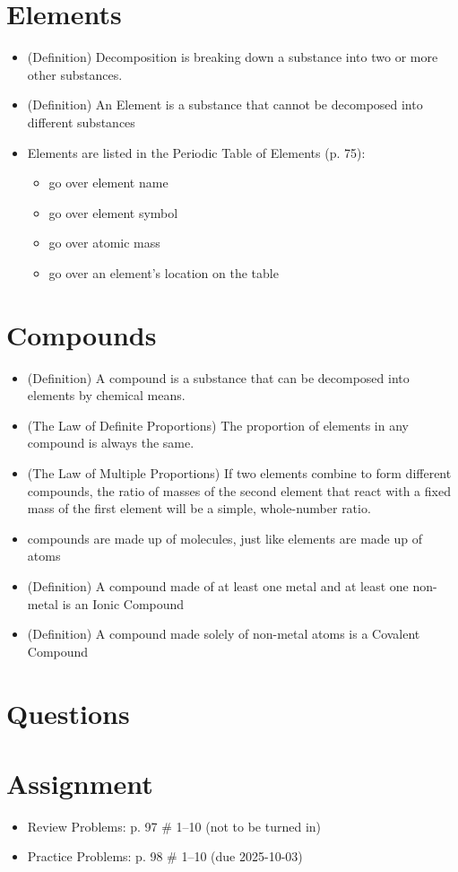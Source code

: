 \documentclass[10pt, oneside]{article}   	%
\begin{document}
\section*{Elements}
\begin{itemize}
\item (Definition) Decomposition is breaking down a substance into two or more other substances.
\item (Definition) An Element is a substance that cannot be decomposed into different substances
\item Elements are listed in the Periodic Table of Elements (p. 75):
\begin{itemize}
\item go over element name
\item go over element symbol
\item go over atomic mass
\item go over an element's location on the table
\end{itemize}
\end{itemize}

\section*{Compounds}

\begin{itemize}
\item (Definition) A compound is a substance that can be decomposed into elements by chemical means.
\item (The Law of Definite Proportions) The proportion of elements in any compound is always the same.
\item (The Law of Multiple Proportions) If two elements combine to form different compounds, 
the ratio of masses of the second element that react with a fixed mass of the first element will be a simple, whole-number ratio.
\item compounds are made up of molecules, just like elements are made up of atoms
\item (Definition) A compound made of at least one metal and at least one non-metal is an Ionic Compound
\item (Definition) A compound made solely of non-metal atoms is a Covalent Compound
\end{itemize}


\section*{Questions}

\section*{Assignment}
\begin{itemize}
\item Review Problems: p. 97 \# 1--10 (not to be turned in)
\item Practice Problems: p. 98 \# 1--10 (due 2025-10-03)
\end{itemize}
\end{document}
